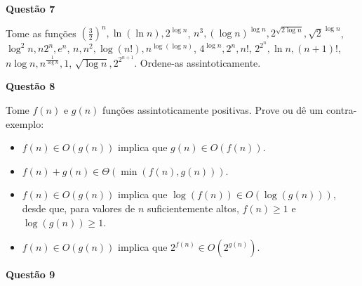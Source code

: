 \documentclass[]{article}
\begin{document}
\vspace{\baselineskip}

\textbf{Questão 7}

Tome as funções \mbox{$(\frac{3}{2})^n, \ln (\ln n), 2^{\log n}$}, \mbox{$n^3, (\log n)^{\log n}, 2^{\sqrt{2 \log n}}, \sqrt{2}^{\log n}$}, \mbox{$\log^2 n, n 2^n, e^n$}, \mbox{$n, n^2, \log (n!), n^{\log (\log n)}$}, \mbox{$4^{\log n}, 2^n, n!$}, \mbox{$2^{2^n}, \ln n, (n + 1)!$}, \mbox{$n \log n, n^{\frac{1}{\log n}}, 1$}, \mbox{$\sqrt{\log n}, 2^{2^{n + 1}}$}.
Ordene-as assintoticamente.

\vspace{\baselineskip}

\textbf{Questão 8}

Tome $f(n)$ e $g(n)$ funções assintoticamente positivas.
Prove ou dê um contra-exemplo:
\begin{itemize}
  \item $f(n) \in O(g(n))$ implica que $g(n) \in O(f(n))$.
  \item $f(n) + g(n) \in \Theta(\min(f(n), g(n)))$.
  \item $f(n) \in O(g(n))$ implica que $\log (f(n)) \in O(\log (g(n)))$, desde que, para valores de $n$ suficientemente altos, $f(n) \geq 1$ e $\log (g(n)) \geq 1$.
  \item $f(n) \in O(g(n))$ implica que $2^{f(n)} \in O(2^{g(n)})$.
\end{itemize}

\vspace{\baselineskip}

\textbf{Questão 9}
\end{document}
